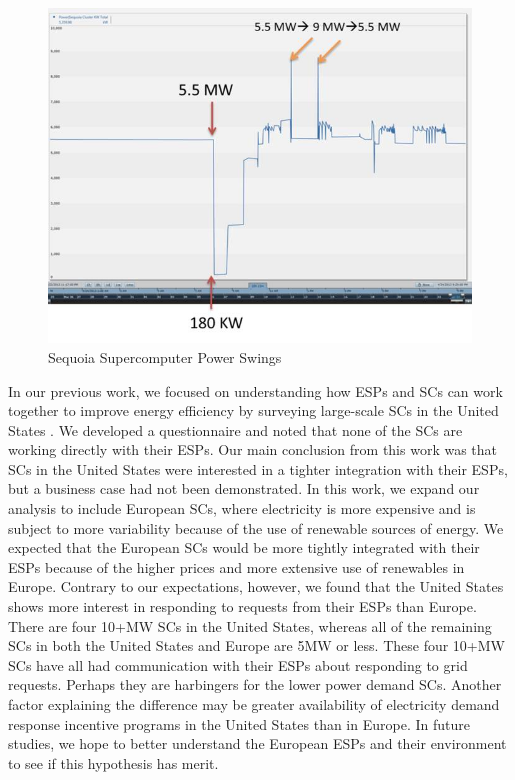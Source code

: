 \documentclass{article}
\begin{document}
\begin{figure}
\begin{center}
\includegraphics[scale=0.7]{figs/Sequoia.jpg}
\caption{Sequoia Supercomputer Power Swings}
\label{fig:seq}
\end{center}
\end{figure}

In our previous work, we focused on understanding how ESPs and SCs can work together to improve energy efficiency by surveying large-scale SCs in the United States \cite{BatesESP}. We developed a questionnaire and noted that none of the SCs are working directly with their ESPs. Our main conclusion from this work was that SCs in the United States were interested in a tighter integration with their ESPs, but a business case had not been demonstrated. In this work, we expand our analysis to include European SCs, where electricity is more expensive and is subject to more variability because of the use of renewable sources of energy. We expected that the European SCs would be more tightly integrated with their ESPs because of the higher prices and more extensive use of renewables in Europe.  Contrary to our expectations, however, we found that the United States shows more interest in responding to requests from their ESPs than Europe.  There are four 10+MW SCs in the United States, whereas all of the remaining SCs in both the United States and Europe are 5MW or less.  These four 10+MW SCs have all had communication with their ESPs about responding to grid requests.  Perhaps they are harbingers for the lower power demand SCs.  Another factor explaining the difference may be greater availability of electricity demand response incentive programs in the United States than in Europe. In future studies, we hope to better understand the European ESPs and their environment to see if this hypothesis has merit. 
\end{document}
